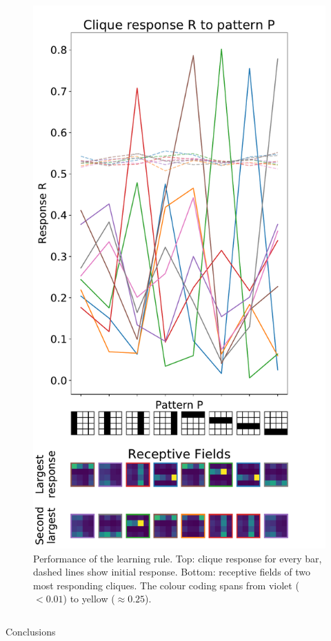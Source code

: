 \documentclass[final,hyperref={pdfpagelabels=false}]{beamer}
\begin{document}
\begin{frame}
\begin{columns}
\begin{column}{.60\textwidth}
\begin{minipage}[T]{.95\textwidth}
{\begin{minipage}[T]{.45\textwidth}
\begin{column}[T]{1\textwidth}
\begin{figure}
						\includegraphics[width=.89\textwidth]{double_complete_tall.pdf}
						\caption{{\color{black}Performance of the learning rule. Top: clique response for every bar, dashed lines show initial response. Bottom: receptive fields of two most responding cliques. The colour coding spans from violet ($<0.01$) to yellow ($\approx 0.25$).}}
						\label{fig:complete}
					\end{figure}
				\end{column}
			\end{minipage}
			\vfill
			\vspace{0.9\baselineskip}
			\begin{emphblock}{Conclusions}

\end{emphblock}}
\end{minipage}
\end{column}
\end{columns}
\end{frame}
\end{document}
